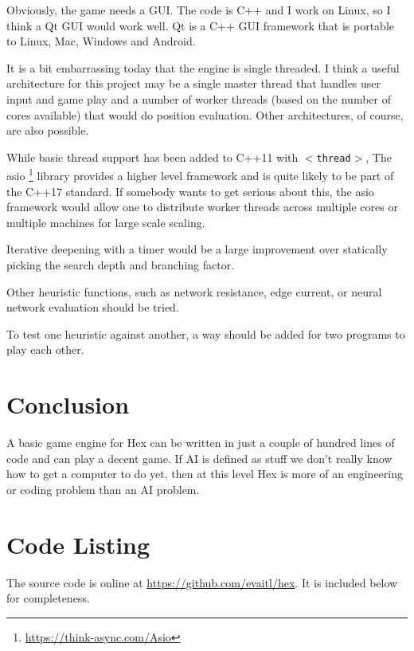 \documentclass[12pt,titlepage]{amsart}
\begin{document}
Obviously, the game needs a GUI. The code is C++ and I work on Linux, so I think
a Qt GUI \cite {Blanchette:2006} would work well. Qt is a C++ GUI framework that
is portable to Linux, Mac, Windows and Android.

It is a bit embarrassing today that the engine is single threaded. I think a
useful architecture for this project may be a single master thread that handles
user input and game play and a number of worker threads (based on the number of
cores available) that would do position evaluation. Other architectures, of
course, are also possible.

While basic thread support has been added to C++11 with \texttt{$<$thread$>$},
The asio \footnote{\url{https://think-async.com/Asio}} library provides a higher
level framework and is quite likely to be part of the C++17 standard. If
somebody wants to get serious about this, the asio framework would allow one to
distribute worker threads across multiple cores or multiple machines for large
scale scaling.

Iterative deepening with a timer would be a large improvement over statically
picking the search depth and branching factor.

Other heuristic functions, such as network resistance, edge current, or neural
network evaluation should be tried.

To test one heuristic against another, a way should be added for two programs to
play each other.

\section{Conclusion}

A basic game engine for Hex can be written in just a couple of hundred lines of
code and can play a decent game. If AI is defined as stuff we don't really know
how to get a computer to do yet, then at this level Hex is more of an
engineering or coding problem than an AI problem.





\appendix
\section{Code Listing}

The source code is online at \url{https://github.com/evaitl/hex}. It is included
below for completeness.

\singlespacing

\end{document}
